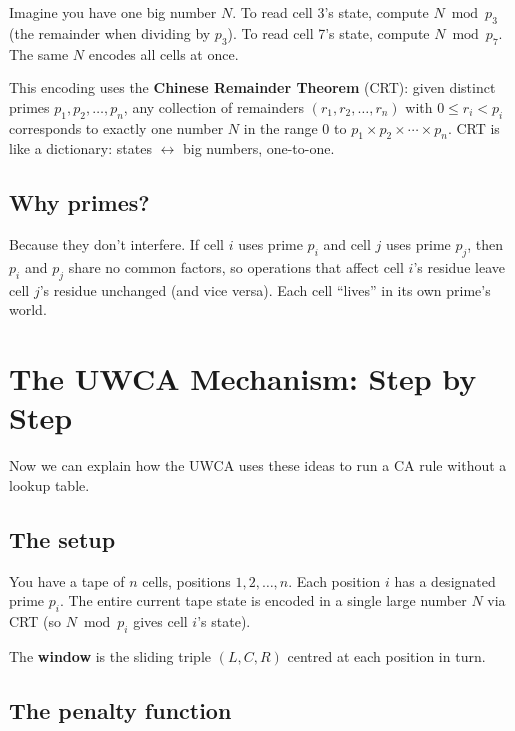 \documentclass[11pt,a4paper]{article}
\newcommand{\term}[1]{\textbf{#1}}
\begin{document}
\begin{tcolorbox}[colback=boxgreen,colframe=green!50!black,title=Analogy]
Imagine you have one big number $N$.  To read cell 3's state, compute
$N \bmod p_3$ (the remainder when dividing by $p_3$).  To read cell 7's
state, compute $N \bmod p_7$.  The same $N$ encodes all cells at once.
\end{tcolorbox}

This encoding uses the \term{Chinese Remainder Theorem} (CRT): given
distinct primes $p_1, p_2, \ldots, p_n$, any collection of remainders
$(r_1, r_2, \ldots, r_n)$ with $0 \leq r_i < p_i$ corresponds to exactly
one number $N$ in the range $0$ to $p_1 \times p_2 \times \cdots \times p_n$.
CRT is like a dictionary: states $\leftrightarrow$ big numbers, one-to-one.

\subsection{Why primes?}

Because they don't interfere.  If cell $i$ uses prime $p_i$ and cell $j$
uses prime $p_j$, then $p_i$ and $p_j$ share no common factors, so
operations that affect cell $i$'s residue leave cell $j$'s residue
unchanged (and vice versa).  Each cell ``lives'' in its own prime's world.

\section{The UWCA Mechanism: Step by Step}

Now we can explain how the UWCA uses these ideas to run a CA rule without
a lookup table.

\subsection{The setup}

You have a tape of $n$ cells, positions $1, 2, \ldots, n$.  Each position $i$
has a designated prime $p_i$.  The entire current tape state is encoded in a
single large number $N$ via CRT (so $N \bmod p_i$ gives cell $i$'s state).

The \term{window} is the sliding triple $(L, C, R)$ centred at each position
in turn.

\subsection{The penalty function}
\end{document}
